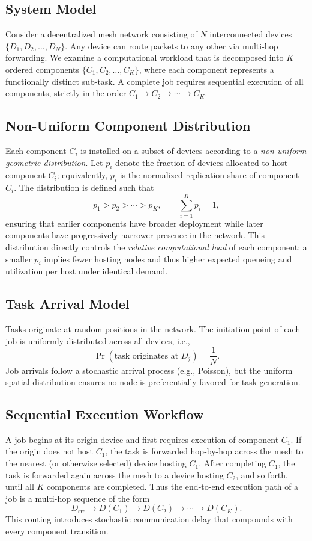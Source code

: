 \documentclass[12pt,a4paper]{article}
\begin{document}
\subsection{System Model}
Consider a decentralized mesh network consisting of $N$ interconnected devices 
$\{D_1, D_2, \ldots, D_N\}$. Any device can route packets to any other via multi-hop forwarding. We examine a computational workload that is decomposed into 
$K$ ordered components $\{C_1, C_2, \ldots, C_K\}$, where each component represents a 
functionally distinct sub-task. A complete job requires sequential execution of all 
components, strictly in the order $C_1 \rightarrow C_2 \rightarrow \cdots \rightarrow C_K$.

\subsection{Non-Uniform Component Distribution}
Each component $C_i$ is installed on a subset of devices according to a
\emph{non-uniform geometric distribution}. Let $p_i$ denote the fraction of devices allocated to host component $C_i$; equivalently, $p_i$ is the normalized replication share of component $C_i$. The distribution is defined such that
\[
p_1 > p_2 > \cdots > p_K,\qquad \sum_{i=1}^{K} p_i = 1,
\]
ensuring that earlier components have broader deployment while later components have progressively narrower presence in the network. This distribution directly controls the \emph{relative computational load} of each component: a smaller $p_i$ implies fewer hosting nodes and thus higher expected queueing and utilization per host under identical demand.

\subsection{Task Arrival Model}
Tasks originate at random positions in the network. The initiation point of each job is uniformly distributed across all devices, i.e.,
\[
\Pr(\text{task originates at } D_j) = \frac{1}{N}.
\]
Job arrivals follow a stochastic arrival process (e.g., Poisson), but the uniform spatial distribution ensures no node is preferentially favored for task generation.

\subsection{Sequential Execution Workflow}
A job begins at its origin device and first requires execution of component $C_1$.
If the origin does not host $C_1$, the task is forwarded hop-by-hop across the mesh to the nearest (or otherwise selected) device hosting $C_1$. After completing $C_1$, the task is forwarded again across the mesh to a device hosting $C_2$, and so forth, until all $K$ components are completed. Thus the end-to-end execution path of a job is a multi-hop sequence of the form
\[
D_{\text{src}} \rightarrow D(C_1) \rightarrow D(C_2) \rightarrow \cdots \rightarrow D(C_K).
\]
This routing introduces stochastic communication delay that compounds with every component transition.
\end{document}
